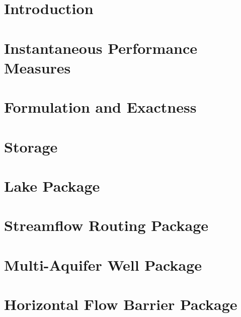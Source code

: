 \chapter{Introduction}
\label{ch:intro}


\chapter{Instantaneous Performance Measures}
\label{ch:instantaneous}


\chapter{Formulation and Exactness}
\label{ch:formulation}


\chapter{Storage}
\label{ch:storage}


\chapter{Lake Package}
\label{ch:lake}


\chapter{Streamflow Routing Package}
\label{ch:sfr}


\chapter{Multi-Aquifer Well Package}
\label{ch:maw}


\chapter{Horizontal Flow Barrier Package}
\label{ch:hfb}

